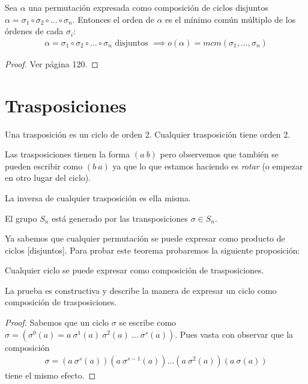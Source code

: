 \begin{thm}
	Sea $\alpha$ una permutación expresada como composición de ciclos disjuntos $\alpha = \sigma_1 \circ \sigma_2 \circ \dots \circ \sigma_n$. Entonces el orden de $\alpha$ es el mínimo común múltiplo de los órdenes de cada $\sigma_i$:
	\begin{align*}
		\alpha = \sigma_1 \circ \sigma_2 \circ \dots \circ \sigma_n \text{ disjuntos } \implies o(\alpha) = mcm(\sigma_1, \dots, \sigma_n)
	\end{align*}
\end{thm}


\begin{proof}
	Ver \cite{dor96} página 120.
\end{proof}

\section{Trasposiciones}

\begin{dfn}[Trasposición]
	Una trasposición es un ciclo de orden 2. Cualquier trasposición tiene orden 2.
\end{dfn}

Las trasposiciones tienen la forma $(a\ b)$ pero observemos que también se pueden escribir como $(b\ a)$ ya que lo que estamos haciendo es \textit{rotar} (o empezar en otro lugar del ciclo).

\begin{pro}
	La inversa de cualquier trasposición es ella misma.
\end{pro}

\begin{thm}
	El grupo $S_n$ está generado por las transposiciones $\sigma \in S_n$.
\end{thm}

Ya sabemos que cualquier permutación se puede expresar como producto de ciclos [disjuntos]. Para probar este teorema probaremos la siguiente proposición:

\begin{pro}
	Cualquier ciclo se puede expresar como composición de trasposiciones.
\end{pro}

La prueba es constructiva y describe la manera de expresar un ciclo como composición de trasposiciones.

\begin{proof}
	Sabemos que un ciclo $\sigma$ se escribe como $\sigma = (\sigma^0(a) = a\ \sigma^1(a)\ \sigma^2(a)\ \dots \ \sigma^s(a))$. Pues vasta con observar que la composición
	\begin{align*}
		\sigma = (a\ \sigma^s(a))(a\ \sigma^{s-1}(a))\dots(a\ \sigma^2(a))(a\ \sigma(a))
	\end{align*}
	tiene el mismo efecto.
\end{proof}

